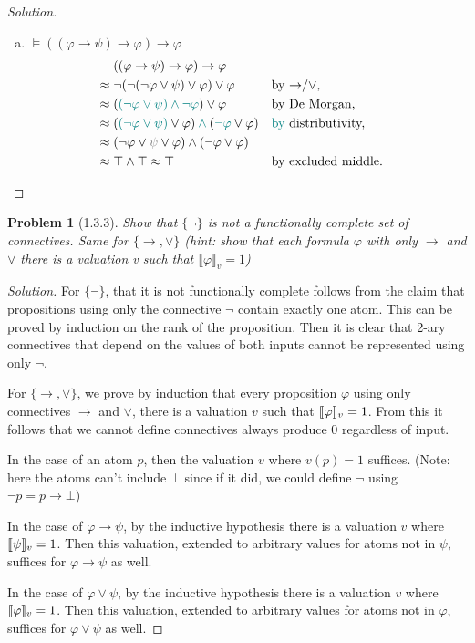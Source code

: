 \documentclass[letter]{article}
\newtheorem{problem}{Problem}
\theoremstyle{definition}
\newenvironment{solution}
{\begin{proof}[Solution]}
	{\end{proof}}
\renewcommand{\phi}{\varphi}
\begin{document}
\begin{solution}
\begin{enumerate}[(a)]
  \item $\models ((\phi \to \psi) \to \phi) \to \phi$
\begin{align*}
  & ((\phi \to \psi) \to \phi) \to \phi &
\\ \approx{}
  & \neg (\neg (\neg \phi \lor \psi) \lor \phi) \lor \phi
  && \text{by \tolor,}
\\ \approx{}
  & ({\color{teal}(\neg \phi \lor \psi) \land \neg \phi}) \lor \phi
  && \text{by De Morgan,}
\\ \approx{}
  & ({\color{teal}(\neg \phi \lor \psi)} \lor \phi) \colop{teal}{\land} ({\color{teal}\neg \phi} \lor \phi)
  && \text{{\color{teal}by} distributivity,}
\\ \approx{}
  & (\neg \phi \lor {\color{gray}\psi} \lor \phi) \land (\neg \phi \lor \phi)
  &&
\\ \approx{}
  & \top \land \top \approx \top
  && \text{by excluded middle.}
\end{align*}
\end{enumerate}
\end{solution}

\begin{problem}[1.3.3] Show that $\{ \neg \}$ is not a functionally complete set of connectives. Same for $\{\to, \lor\}$ (hint: show that each formula $\phi$ with only $\to$ and $\lor$ there is a valuation v such that $\llbracket \phi \rrbracket_v = 1$)
\end{problem}
\begin{solution}
  For $\{ \neg \}$, that it is not functionally complete follows from the claim that propositions using only the connective $\neg$ contain exactly one atom. This can be proved by induction on the rank of the proposition. Then it is clear that 2-ary connectives that depend on the values of both inputs cannot be represented using only $\neg$.

  For $\{\to, \lor\}$, we prove by induction that every proposition $\phi$ using only connectives $\to$ and $\lor$, there is a valuation $v$ such that $\den{\phi} = 1$. From this it follows that we cannot define connectives always produce 0 regardless of input.

  In the case of an atom $p$, then the valuation $v$ where $v(p) = 1$ suffices. (Note: here the atoms can't include $\bot$ since if it did, we could define $\neg$ using $\neg p = p \to \bot$)

  In the case of $\phi \to \psi$, by the inductive hypothesis there is a valuation $v$ where $\llbracket \psi \rrbracket_v = 1$. Then this valuation, extended to arbitrary values for atoms not in $\psi$, suffices for $\phi \to \psi$ as well.

  In the case of $\phi \lor \psi$, by the inductive hypothesis there is a valuation $v$ where $\den{\phi} = 1$. Then this valuation, extended to arbitrary values for atoms not in $\phi$, suffices for $\phi \lor \psi$ as well.
\end{solution}
\end{document}
